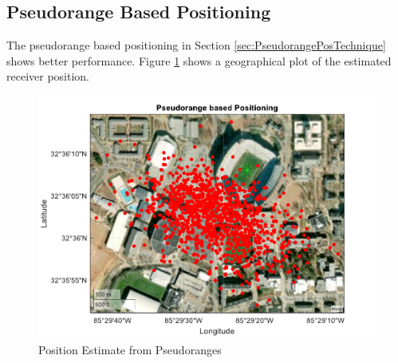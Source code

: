 \documentclass[12pt]{report}
\begin{document}
\subsection{Pseudorange Based Positioning}
The pseudorange based positioning in Section \ref{sec:PseudorangePosTechnique} shows better performance. Figure \ref{fig:CleanPseudo15minIridPosit} shows a geographical plot of the estimated receiver position. 
\begin{figure}[h!]
    \centering
    \includegraphics[width=5in]
    {15min_irid_clean_pseudorangebased.pdf}
    \caption{Position Estimate from Pseudoranges}
    \label{fig:CleanPseudo15minIridPosit}
\end{figure}
\end{document}
